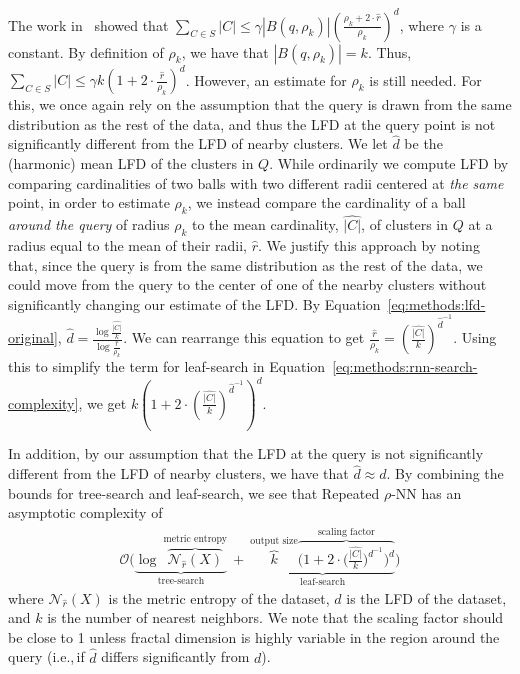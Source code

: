 The work in~\cite{yu2015entropy} showed that $\sum_{C \in S} |C| \leq \gamma  \left| B(q, \rho_k) \right| \left(\frac{\rho_k + 2 \cdot \hat{r}}{\rho_k} \right)^d$, where $\gamma$ is a constant.
By definition of $\rho_k$, we have that $|B(q, \rho_k)| = k$.
Thus, $\sum_{C \in S} |C| \leq \gamma k \left( 1 + 2 \cdot \frac{\hat{r}}{\rho_k} \right)^d$.
However, an estimate for $\rho_k$ is still needed.
For this, we once again rely on the assumption that the query is drawn from the same distribution as the rest of the data, and thus the LFD at the query point is not significantly different from the LFD of nearby clusters.
We let $\hat{d}$ be the (harmonic) mean LFD of the clusters in $Q$.
While ordinarily we compute LFD by comparing cardinalities of two balls with two different radii centered at \textit{the same} point, in order to estimate $\rho_k$, we instead compare the cardinality of a ball \textit{around the query} of radius $\rho_k$ to the mean cardinality, $\hat{|C|}$, of clusters in $Q$ at a radius equal to the mean of their radii, $\hat{r}$.
We justify this approach by noting that, since the query is from the same distribution as the rest of the data, we could move from the query to the center of one of the nearby clusters without significantly changing our estimate of the LFD.
By Equation~\ref{eq:methods:lfd-original}, $\hat{d} = \frac{\log{}\frac{\hat{|C|}}{k}}{\log{}\frac{\hat{r}}{\rho_k}}$.
We can rearrange this equation to get $\frac{\hat{r}}{\rho_k} = \left( \frac{\hat{|C|}}{k} \right)^{\hat{d}^{-1}}$.
Using this to simplify the term for leaf-search in Equation~\ref{eq:methods:rnn-search-complexity}, we get $k \left( 1 + 2 \cdot \left( \frac{\hat{|C|}}{k} \right) ^ {\hat{d}^{-1}} \right)^d$.

In addition, by our assumption that the LFD at the query is not significantly different from the LFD of nearby clusters, we have that $\hat{d} \approx d$.
By combining the bounds for tree-search and leaf-search, we see that Repeated $\rho$-NN has an asymptotic complexity of
\begin{gather}
    \mathcal{O}
    \Bigg(
        \underbrace{
            \log~\overbrace{\mathcal{N}_{\hat{r}}(X)}^{\textrm{metric entropy}}
        }_{\textrm{tree-search}}
        \ + \
        \underbrace{
            \overbrace{k}^{\textrm{output size}}
            \overbrace{\bigg( 1 + 2 \cdot \Big( \frac{\hat{|C|}}{k} \Big) ^ {d^{-1}} \bigg)^d}^{\textrm{scaling factor}}
        }_{\textrm{leaf-search}}
    \Bigg)
    \label{eq:methods:repeated-rnn-complexity}
\end{gather}
where $\mathcal{N}_{\hat{r}}(X)$ is the metric entropy of the dataset, $d$ is the LFD of the dataset, and $k$ is the number of nearest neighbors.
We note that the scaling factor should be close to 1 unless fractal dimension is highly variable in the region around the query (i.e.,\,if $\hat{d}$ differs significantly from $d$).


